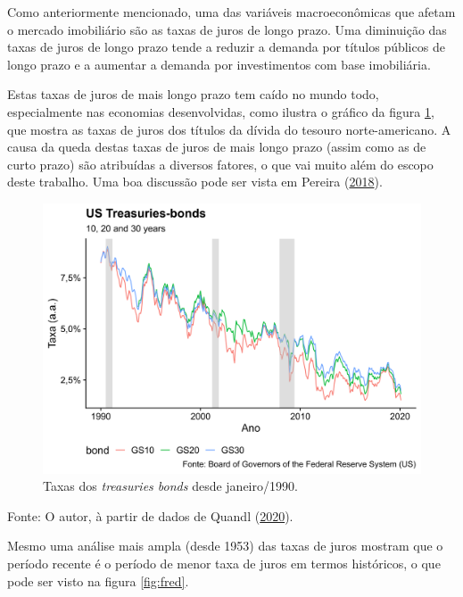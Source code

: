 \documentclass[
	12pt,				%
	oneside,			%
	a4paper,			%
	chapter=TITLE,		%
	section=TITLE,		%
	english,			%
	brazil				%
	]{abntex2}
\newcommand{\bcenter}{\begin{center}}
\newcommand{\ecenter}{\end{center}}
\begin{document}
Como anteriormente mencionado, uma das variáveis macroeconômicas que afetam o
mercado imobiliário são as taxas de juros de longo prazo. Uma diminuição das
taxas de juros de longo prazo tende a reduzir a demanda por títulos públicos de
longo prazo e a aumentar a demanda por investimentos com base imobiliária.

Estas taxas de juros de mais longo prazo tem caído no mundo todo,
especialmente nas economias desenvolvidas, como ilustra o gráfico da figura
\ref{fig:yields}, que mostra as taxas de juros dos títulos da dívida do tesouro
norte-americano. A causa da queda destas taxas de juros de mais longo prazo
(assim como as de curto prazo) são atribuídas a diversos fatores, o que vai
muito além do escopo deste trabalho. Uma boa discussão pode ser vista em Pereira (\protect\hyperlink{ref-bresser2018}{2018}).
\begin{figure}[H]

{\centering \includegraphics[width=0.7\linewidth]{images/yields-1} 

}

\caption{Taxas dos \emph{treasuries bonds} desde janeiro/1990.}\label{fig:yields}
\end{figure}
\bcenter

Fonte: O autor, à partir de dados de Quandl (\protect\hyperlink{ref-QuandlWIKI}{2020}).
\ecenter

Mesmo uma análise mais ampla (desde 1953) das taxas de juros mostram que o
período recente é o período de menor taxa de juros em termos históricos, o que
pode ser visto na figura \ref{fig:fred}.
\end{document}

